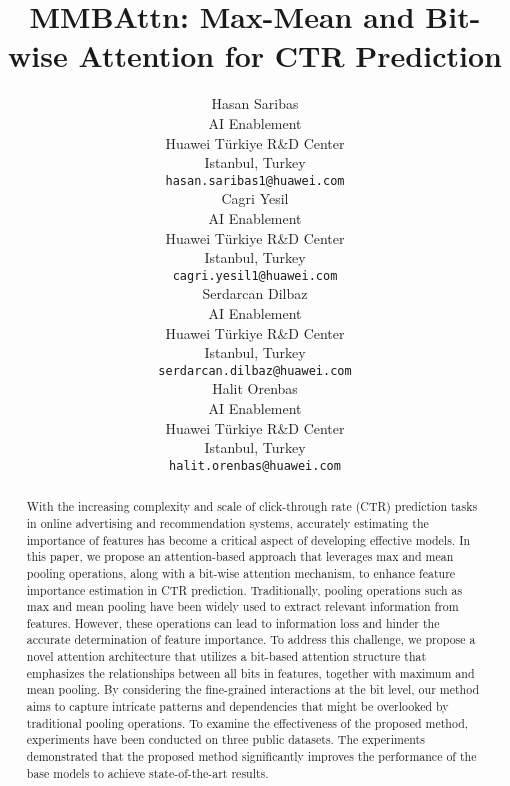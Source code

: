 \documentclass{article}
\title{MMBAttn: \textbf{M}ax-\textbf{M}ean and \textbf{B}it-wise \textbf{Att}e\textbf{n}tion for CTR Prediction}
\author{
 Hasan Saribas \\
  AI Enablement\\
  Huawei Türkiye R\&D Center\\
  Istanbul, Turkey \\
  \texttt{hasan.saribas1@huawei.com} \\
\And
 Cagri Yesil \\
  AI Enablement\\
  Huawei Türkiye R\&D Center\\
  Istanbul, Turkey \\
  \texttt{cagri.yesil1@huawei.com} \\
  \And
 Serdarcan Dilbaz \\
  AI Enablement\\
  Huawei Türkiye R\&D Center\\
  Istanbul, Turkey \\
  \texttt{serdarcan.dilbaz@huawei.com} \\
   \And
 Halit Orenbas \\
  AI Enablement\\
  Huawei Türkiye R\&D Center\\
  Istanbul, Turkey \\
  \texttt{halit.orenbas@huawei.com} \\
}
\begin{document}
\maketitle
\begin{abstract}
With the increasing complexity and scale of click-through rate (CTR) prediction tasks in online advertising and recommendation systems, accurately estimating the importance of features has become a critical aspect of developing effective models. In this paper, we propose an attention-based approach that leverages max and mean pooling operations, along with a bit-wise attention mechanism, to enhance feature importance estimation in CTR prediction. Traditionally, pooling operations such as max and mean pooling have been widely used to extract relevant information from features. However, these operations can lead to information loss and hinder the accurate determination of feature importance. To address this challenge, we propose a novel attention architecture that utilizes a bit-based attention structure that emphasizes the relationships between all bits in features, together with maximum and mean pooling. By considering the fine-grained interactions at the bit level, our method aims to capture intricate patterns and dependencies that might be overlooked by traditional pooling operations. To examine the effectiveness of the proposed method, experiments have been conducted on three public datasets. The experiments demonstrated that the proposed method significantly improves the performance of the base models to achieve state-of-the-art results.
\end{abstract}

\end{document}
